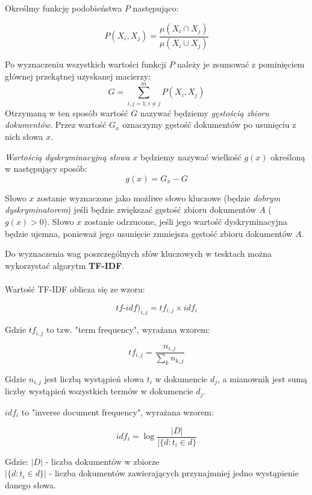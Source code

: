 \documentclass{classrep}
\begin{document}
Określmy funkcję podobieństwa $P$ następująco:

\begin{equation}
 P(X_i, X_j) = \frac {\mu(X_i \cap X_j)} {\mu(X_i \cup X_j)}
\end{equation}

Po wyznaczeniu wszystkich wartości funkcji $P$ należy je zsumować z pominięciem głównej przekątnej uzyskanej macierzy:
\begin{equation}
 G = \sum _{i, j = 1; i \neq j}^{m} P(X_i, X_j)
\end{equation}
Otrzymaną w ten sposób wartość $G$ nazywać będziemy \textit{gęstością zbioru dokumentów}. Przez wartość $G_x$ oznaczymy gęstość dokumentów po usunięciu z nich słowa $x$.

\textit{Wartością dyskryminacyjną słowa $x$} będziemy nazywać wielkość $g(x)$ określoną w następujący sposób:
\begin{equation}
 g(x) = G_x - G
\end{equation}

Słowo $x$ zostanie wyznaczone jako możliwe słowo kluczowe (będzie \textit{dobrym dyskryminatorem}) jeśli będzie zwiększać gęstość zbioru dokumentów $A$ ($g(x) > 0$). Słowo $x$ zostanie odrzucone, jeśli jego wartość dyskryminacyjna będzie ujemna, ponieważ jego usunięcie zmniejsza gęstość zbioru dokumentów $A$.

  
Do wyznaczenia wag poszczególnych słów kluczowych w tesktach można wykorzystać algorytm 
\textbf{TF-IDF}.

\paragraph{}
Wartość TF-IDF oblicza się ze wzoru:

$$ tf\mbox{-}idf)_{i,j} = tf_{i,j} \times  idf_{i}$$

Gdzie $tf_{i, j}$ to tzw. "term frequency", wyrażana wzorem:

$$ tf_{i,j} = \frac{n_{i,j}}{\sum_k n_{k,j}}$$

Gdzie $n_{i,j}$ jest liczbą wystąpień słowa $t_{i}$ w dokumencie $d_{j}$, a mianownik jest sumą liczby wystąpień wszystkich termów w dokumencie $d_{j}$.


$idf_{i}$ to "inverse document frequency", wyrażana wzorem:

$$idf_{i} =  \log \frac{|D|}{|\{d: t_{i} \in d\}}$$

Gdzie:
$|D|$ - liczba dokumentów w zbiorze\\
$|\{d : t_{i} \in d\}|$ - liczba dokumentów zawierających przynajmniej jedno wystąpienie danego słowa.
\end{document}
